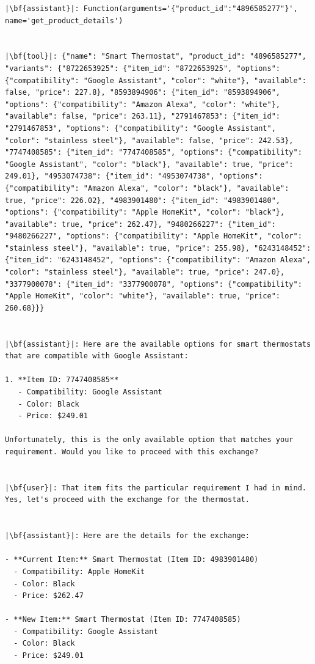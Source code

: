 \begin{longlisting}
\begin{verbatim}
|\bf{assistant}|: Function(arguments='{"product_id":"4896585277"}', name='get_product_details')


|\bf{tool}|: {"name": "Smart Thermostat", "product_id": "4896585277", "variants": {"8722653925": {"item_id": "8722653925", "options": {"compatibility": "Google Assistant", "color": "white"}, "available": false, "price": 227.8}, "8593894906": {"item_id": "8593894906", "options": {"compatibility": "Amazon Alexa", "color": "white"}, "available": false, "price": 263.11}, "2791467853": {"item_id": "2791467853", "options": {"compatibility": "Google Assistant", "color": "stainless steel"}, "available": false, "price": 242.53}, "7747408585": {"item_id": "7747408585", "options": {"compatibility": "Google Assistant", "color": "black"}, "available": true, "price": 249.01}, "4953074738": {"item_id": "4953074738", "options": {"compatibility": "Amazon Alexa", "color": "black"}, "available": true, "price": 226.02}, "4983901480": {"item_id": "4983901480", "options": {"compatibility": "Apple HomeKit", "color": "black"}, "available": true, "price": 262.47}, "9480266227": {"item_id": "9480266227", "options": {"compatibility": "Apple HomeKit", "color": "stainless steel"}, "available": true, "price": 255.98}, "6243148452": {"item_id": "6243148452", "options": {"compatibility": "Amazon Alexa", "color": "stainless steel"}, "available": true, "price": 247.0}, "3377900078": {"item_id": "3377900078", "options": {"compatibility": "Apple HomeKit", "color": "white"}, "available": true, "price": 260.68}}}


|\bf{assistant}|: Here are the available options for smart thermostats that are compatible with Google Assistant:

1. **Item ID: 7747408585**
   - Compatibility: Google Assistant
   - Color: Black
   - Price: $249.01

Unfortunately, this is the only available option that matches your requirement. Would you like to proceed with this exchange?


|\bf{user}|: That item fits the particular requirement I had in mind. Yes, let's proceed with the exchange for the thermostat.


|\bf{assistant}|: Here are the details for the exchange:

- **Current Item:** Smart Thermostat (Item ID: 4983901480)
  - Compatibility: Apple HomeKit
  - Color: Black
  - Price: $262.47

- **New Item:** Smart Thermostat (Item ID: 7747408585)
  - Compatibility: Google Assistant
  - Color: Black
  - Price: $249.01


\end{verbatim}
\end{longlisting}
